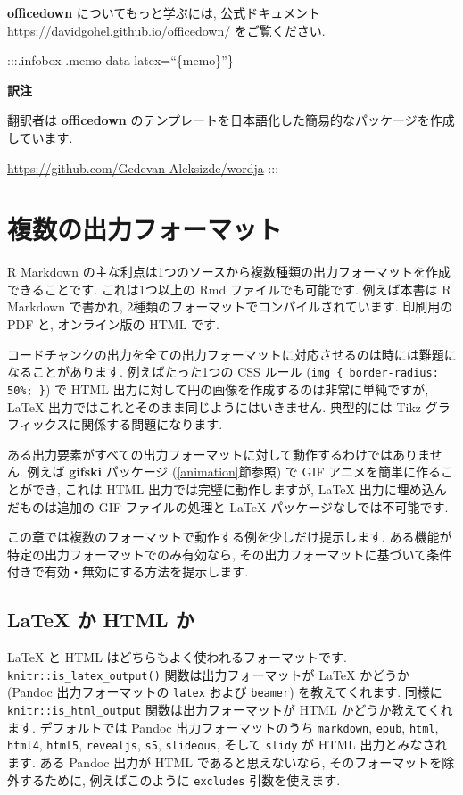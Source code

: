 \documentclass[
  11pt,
  lualatex,
  ja=standard]{bxjsreport}
\begin{document}
\textbf{officedown} についてもっと学ぶには, 公式ドキュメント \url{https://davidgohel.github.io/officedown/} をご覧ください.

:::.infobox .memo data-latex=``\{memo\}''\}

\textbf{訳注}

翻訳者は \textbf{officedown} のテンプレートを日本語化した簡易的なパッケージを作成しています.

\url{https://github.com/Gedevan-Aleksizde/wordja} :::

\hypertarget{multi-formats}{%
\chapter{複数の出力フォーマット}\label{multi-formats}}

R Markdown の主な利点は1つのソースから複数種類の出力フォーマットを作成できることです. これは1つ以上の Rmd ファイルでも可能です. 例えば本書は R Markdown で書かれ, 2種類のフォーマットでコンパイルされています. 印刷用の PDF と, オンライン版の HTML です.

コードチャンクの出力を全ての出力フォーマットに対応させるのは時には難題になることがあります. 例えばたった1つの CSS ルール (\texttt{img \{ border-radius: 50\%; \}}) で HTML 出力に対して円の画像を作成するのは非常に単純ですが, LaTeX 出力ではこれとそのまま同じようにはいきません. 典型的には Tikz グラフィックスに関係する問題になります.

ある出力要素がすべての出力フォーマットに対して動作するわけではありません. 例えば \textbf{gifski} パッケージ \autocite{R-gifski} (\ref{animation}節参照) で GIF アニメを簡単に作ることができ, これは HTML 出力では完璧に動作しますが, LaTeX 出力に埋め込んだものは追加の GIF ファイルの処理と LaTeX パッケージなしでは不可能です.

この章では複数のフォーマットで動作する例を少しだけ提示します. ある機能が特定の出力フォーマットでのみ有効なら, その出力フォーマットに基づいて条件付きで有効・無効にする方法を提示します.

\hypertarget{latex-html}{%
\section{LaTeX か HTML か}\label{latex-html}}

LaTeX と HTML はどちらもよく使われるフォーマットです. \texttt{knitr::is\_latex\_output()} 関数は出力フォーマットが LaTeX かどうか (Pandoc 出力フォーマットの \texttt{latex} および \texttt{beamer}) を教えてくれます. 同様に \texttt{knitr::is\_html\_output} 関数は出力フォーマットが HTML かどうか教えてくれます. デフォルトでは Pandoc 出力フォーマットのうち \texttt{markdown}, \texttt{epub}, \texttt{html}, \texttt{html4}, \texttt{html5}, \texttt{revealjs}, \texttt{s5}, \texttt{slideous}, そして \texttt{slidy} が HTML 出力とみなされます. ある Pandoc 出力が HTML であると思えないなら, そのフォーマットを除外するために, 例えばこのように \texttt{excludes} 引数を使えます.
\end{document}
